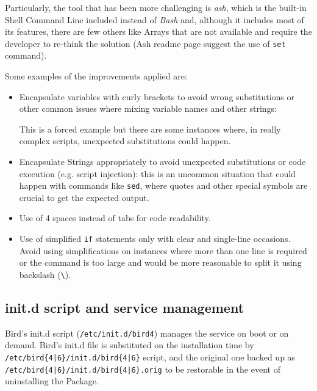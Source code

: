 Particularly, the tool that has been more challenging is \textit{ash}, which is the built-in Shell Command Line included instead of \textit{Bash} and, although it includes most of its features, there are few others like Arrays that are not available and require the developer to re-think the solution (Ash readme page suggest the use of \texttt{set} command).

Some examples of the improvements applied are:
\begin{itemize}
    \item Encapsulate variables with curly brackets to avoid wrong substitutions or other common issues where mixing variable names and other strings:
     
    This is a forced example but there are some instances where, in really complex scripts, unexpected substitutions could happen.
    \item Encapsulate Strings appropriately to avoid unexpected substitutions or code execution (e.g. script injection): this is an uncommon situation that could happen with commands like \texttt{sed}, where quotes and other special symbols are crucial to get the expected output.
    \item Use of 4 spaces instead of tabs for code readability.
    \item Use of simplified \texttt{if} statements only with clear and single-line occasions. Avoid using simplifications on instances where more than one line is required or the command is too large and would be more reasonable to split it using backslash (\texttt{\textbackslash}).
    
\end{itemize}

\subsection{init.d script and service management}
\label{sec:initd}
Bird's init.d script (\texttt{/etc/init.d/bird4}) manages the service on boot or on demand. Bird's init.d file is substituted on the installation time by \texttt{/etc/bird\{4|6\}/init.d/bird\{4|6\}} script, and the original one backed up as \texttt{/etc/bird\{4|6\}/init.d/bird\{4|6\}.orig} to be restorable in the event of uninstalling the Package.

